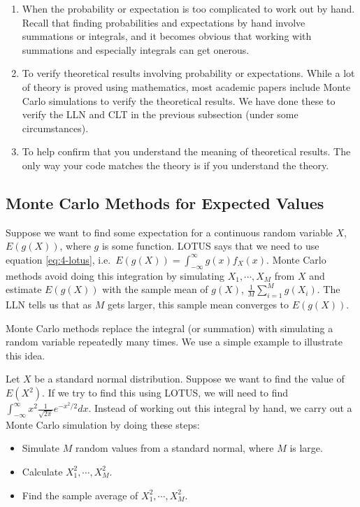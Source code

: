 \documentclass[
]{book}
\providecommand{\tightlist}{%
  \setlength{\itemsep}{0pt}\setlength{\parskip}{0pt}}
\begin{document}
\begin{enumerate}
\def\labelenumi{\arabic{enumi}.}
\item
  When the probability or expectation is too complicated to work out by hand. Recall that finding probabilities and expectations by hand involve summations or integrals, and it becomes obvious that working with summations and especially integrals can get onerous.
\item
  To verify theoretical results involving probability or expectations. While a lot of theory is proved using mathematics, most academic papers include Monte Carlo simulations to verify the theoretical results. We have done these to verify the LLN and CLT in the previous subsection (under some circumstances).
\item
  To help confirm that you understand the meaning of theoretical results. The only way your code matches the theory is if you understand the theory.
\end{enumerate}

\hypertarget{monte-carlo-methods-for-expected-values}{%
\subsection{Monte Carlo Methods for Expected Values}\label{monte-carlo-methods-for-expected-values}}

Suppose we want to find some expectation for a continuous random variable \(X\), \(E(g(X))\), where \(g\) is some function. LOTUS says that we need to use equation \eqref{eq:4-lotus}, i.e.~\(E(g(X)) = \int_{-\infty}^{\infty} g(x) f_X(x).\) Monte Carlo methods avoid doing this integration by simulating \(X_1, \cdots, X_M\) from \(X\) and estimate \(E(g(X))\) with the sample mean of \(g(X)\), \(\frac{1}{M} \sum_{i=1}^M g(X_i)\). The LLN tells us that as \(M\) gets larger, this sample mean converges to \(E(g(X))\).

Monte Carlo methods replace the integral (or summation) with simulating a random variable repeatedly many times. We use a simple example to illustrate this idea.

Let \(X\) be a standard normal distribution. Suppose we want to find the value of \(E(X^2)\). If we try to find this using LOTUS, we will need to find \(\int_{-\infty}^{\infty} x^2 \frac{1}{\sqrt{2 \pi}} e^{-x^2/2} dx\). Instead of working out this integral by hand, we carry out a Monte Carlo simulation by doing these steps:

\begin{itemize}
\tightlist
\item
  Simulate \(M\) random values from a standard normal, where \(M\) is large.
\item
  Calculate \(X_1^2, \cdots, X_M^2\).
\item
  Find the sample average of \(X_1^2, \cdots, X_M^2\).
\end{itemize}
\end{document}
